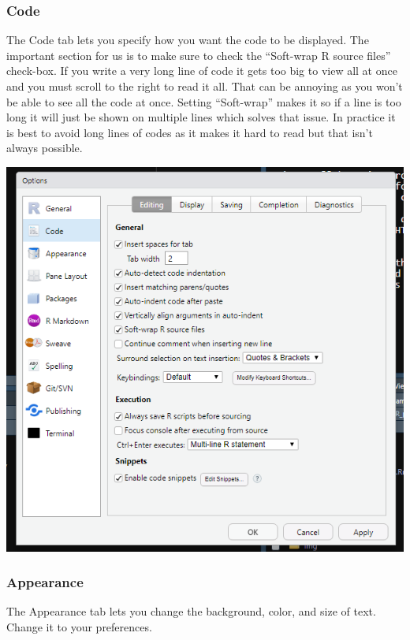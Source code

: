 \documentclass[
  12pt,
]{book}
\begin{document}
\hypertarget{code}{%
\subsubsection{Code}\label{code}}

The Code tab lets you specify how you want the code to be displayed. The important section for us is to make sure to check the ``Soft-wrap R source files'' check-box. If you write a very long line of code it gets too big to view all at once and you must scroll to the right to read it all. That can be annoying as you won't be able to see all the code at once. Setting ``Soft-wrap'' makes it so if a line is too long it will just be shown on multiple lines which solves that issue. In practice it is best to avoid long lines of codes as it makes it hard to read but that isn't always possible.

\includegraphics{images/rstudio_7.PNG}

\hypertarget{appearance}{%
\subsubsection{Appearance}\label{appearance}}

The Appearance tab lets you change the background, color, and size of text. Change it to your preferences.
\end{document}
